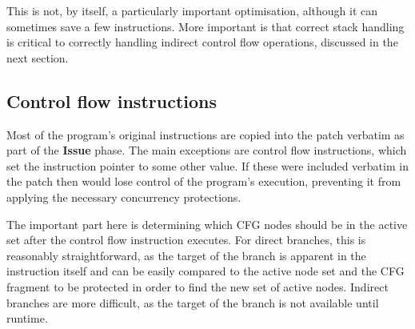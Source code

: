 This is not, by itself, a particularly important optimisation,
although it can sometimes save a few instructions.  More important is
that correct stack handling is critical to correctly handling indirect
control flow operations, discussed in the next section.

\subsection{Control flow instructions}


Most of the program's original instructions are copied into the patch
verbatim as part of the \textbf{Issue} phase.  The main exceptions are
control flow instructions, which set the instruction pointer to some
other value.  If these were included verbatim in the patch then
{\implementation} would lose control of the program's execution,
preventing it from applying the necessary concurrency protections.

The important part here is determining which CFG nodes should be in
the active set after the control flow instruction executes.  For
direct branches, this is reasonably straightforward, as the target of
the branch is apparent in the instruction itself and can be easily
compared to the active node set and the CFG fragment to be protected
in order to find the new set of active nodes.  Indirect branches are
more difficult, as the target of the branch is not available until
runtime.
                                                                                                                                                                                                                                 
                                                 

